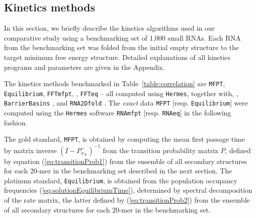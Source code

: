 \subsection{Kinetics methods}

In this section, we briefly describe the kinetics algorithms used in our
comparative study using a benchmarking set of 1,000 small RNAs. Each RNA from
the benchmarking set was folded from the initial empty structure to the
target minimum free energy structure.  Detailed
explanations of all kinetics programs and parameters are given
in the Appendix.

The kinetics methods benchmarked in Table~\ref{table:correlation}
are {\tt MFPT},
{\tt Equilibrium},
{\tt FFTmfpt},
\fftbor,
{\tt FFTeq} -- all computed using {\tt Hermes}, together with,
\kinfold \cite{flammHofacker},
{\tt BarrierBasins} \cite{wolfingerStadler:kinetics},
and {\tt RNA2Dfold} \cite{hofacker:RNAbor2D}. The {\em exact} data {\tt MFPT}
[resp. {\tt Equilibrium}] were computed using the {\tt Hermes} software {\tt RNAmfpt}
[resp. {\tt RNAeq}] in the following fashion.

The gold standard, {\tt MFPT}, is obtained by computing the
mean first passage time by matrix inverse $(I - P^{-}_{x_{\infty}})^{-1}$
from the transition probability matrix $P$, defined by equation
(\ref{eq:transitionProb1}) from the ensemble of all secondary structures
for each 20-mer in the benchmarking set described in the next section.
The platinum standard, {\tt Equilibrium}, is obtained from the
population occupancy frequencies
(\ref{eq:solutionEquilibriumTime}), determined by spectral decomposition
of the rate matrix, the latter defined by
(\ref{eq:transitionProb2}) from the ensemble of all secondary structures
for each 20-mer in the benchmarking set.

